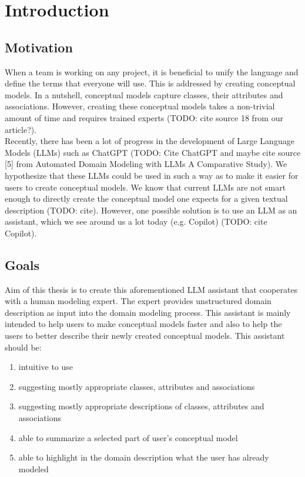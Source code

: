\chapter*{Introduction}


\section*{Motivation}
When a team is working on any project, it is beneficial to unify the language and define the terms 
that everyone will use. This is addressed by creating conceptual models. In a nutshell, conceptual 
models capture classes, their attributes and associations. However, creating these conceptual 
models takes a non-trivial amount of time and requires trained experts (TODO: cite source 18 from our article?). \\

Recently, there has been a lot of progress in the development of Large Language Models (LLMs) such 
as ChatGPT (TODO: Cite ChatGPT and maybe cite source [5] from Automated Domain Modeling with LLMs A Comparative Study). We hypothesize that these LLMs could be used in such a way as to make it easier for 
users to create conceptual models. We know that current LLMs are not smart enough to directly 
create the conceptual model one expects for a given textual description (TODO: cite). However, one possible solution is to use an LLM as an assistant, which we see around us a lot today (e.g. Copilot) (TODO: cite Copilot). \\



\section*{Goals}
Aim of this thesis is to create this aforementioned LLM assistant that cooperates with a human modeling expert. The expert provides unstructured domain description as input into the domain modeling process.
This assistant is mainly intended to help users to make conceptual models faster and also to help the users to better describe their newly created conceptual models. This assistant should be:
\begin{enumerate}
\item intuitive to use
\item suggesting mostly appropriate classes, attributes and associations
\item suggesting mostly appropriate descriptions of classes, attributes and associations
\item able to summarize a selected part of user's conceptual model
\item able to highlight in the domain description what the user has already modeled \\
\end{enumerate}

